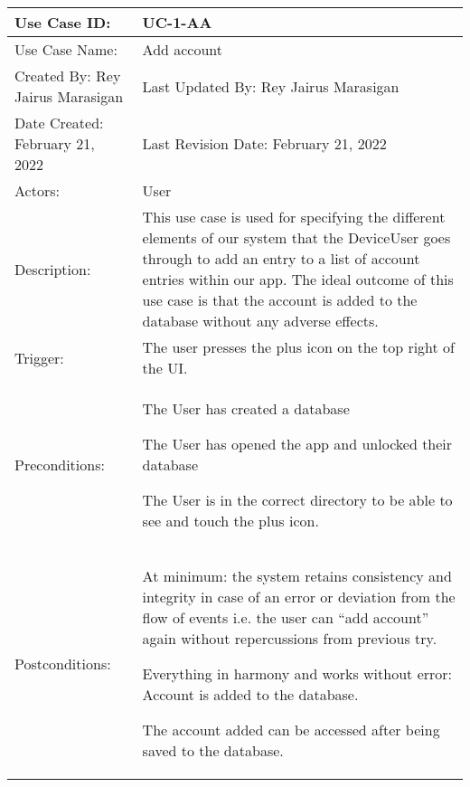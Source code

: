 \documentclass[stu]{apa7}
\newcommand{\nextitem}{\par\hspace*{\labelsep}\textbullet\hspace*{\labelsep}}
\begin{document}
\scriptsize{\begin{xltabular}{\textwidth}{|l|X|}
  \hline Use Case ID: & UC-1-AA \\ \hline

  Use Case Name: & Add account \\ \hline

  Created By: Rey Jairus Marasigan & Last Updated By: Rey Jairus Marasigan \\ \hline

  Date Created: February 21, 2022 & Last Revision Date: February 21, 2022 \\ \hline

  Actors: & \nextitem User \\ \hline

  Description: &  This use case is used for specifying the different elements of our system that the DeviceUser goes through to add an entry to a list of account entries within our app. The ideal outcome of this use case is that the account is added to the database without any adverse effects. \\ \hline

  Trigger: & The user presses the plus icon on the top right of the UI. \\ \hline

  Preconditions: & \nextitem The User has created a database \nextitem The User has opened the app and unlocked their database \nextitem The User is in the correct directory to be able to see and touch the plus icon. \\ \hline

  Postconditions: & \nextitem At minimum: the system retains consistency and integrity in case of an error or deviation from the flow of events i.e. the user can “add account” again without repercussions from previous try.
    \nextitem Everything in harmony and works without error: Account is added to the database.
    \nextitem The account added can be accessed after being saved to the database. \\ \hline


\end{xltabular}}
\end{document}
